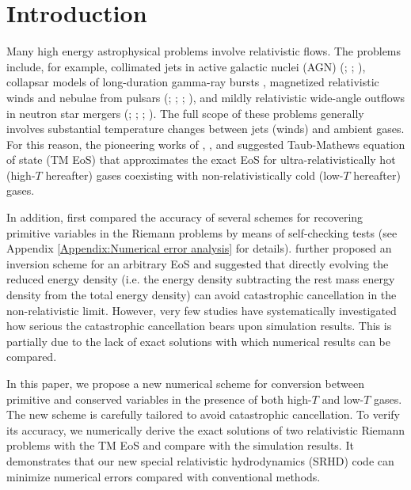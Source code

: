 \documentclass[twocolumn]{aastex63}
\begin{document}
\section{Introduction}
 Many high energy astrophysical problems involve relativistic flows. The problems include, for example, collimated jets in active galactic nuclei (AGN) (\citealt{Chiueh-1991ApJ...377..462C}; \citealt{Chiueh-1992ApJ...394..459L}; \citealt{Blandford2018}), collapsar models of long-duration gamma-ray bursts \citep{LongGRB}, magnetized relativistic winds and nebulae from pulsars (\citealt{1984ApJ...283..694K}; \citealt{1984ApJ...283..710K}; \citealt{Chiue-PhysRevLett.63.113}; \citealt{Chiueh_1998}), and mildly relativistic wide-angle outflows in neutron star mergers (\citealt{NM2}; \citealt{NM1}; \citealt{NM3}; \citealt{NM4}). The full scope of these problems generally involves substantial temperature changes between jets (winds) and ambient gases. For this reason, the pioneering works of \cite{Taub}, \cite{TM_EOS}, and \cite{Compare_TM_EOS} suggested Taub-Mathews equation of state (TM EoS) that approximates the exact EoS \citep{Synge} for ultra-relativistically hot (high-$T$ hereafter) gases coexisting with non-relativistically cold (low-$T$ hereafter) gases.

 In addition, \cite{Noble_2006} first compared the accuracy of several schemes for recovering primitive variables in the Riemann problems by means of self-checking tests (see Appendix \ref{Appendix:Numerical error analysis} for details). \cite{NR_Limit} further proposed an inversion scheme for an arbitrary EoS and suggested that directly evolving the reduced energy density (i.e. the energy density subtracting the rest mass energy density from the total energy density) can avoid catastrophic cancellation in the non-relativistic limit. However, very few studies have systematically investigated how serious the catastrophic cancellation bears upon simulation results. This is partially due to the lack of exact solutions with which numerical results can be compared.

 In this paper, we propose a new numerical scheme for conversion between primitive and conserved variables in the presence of both high-$T$ and low-$T$ gases. The new scheme is carefully tailored to avoid catastrophic cancellation. To verify its accuracy, we numerically derive the exact solutions of two relativistic Riemann problems with the TM EoS and compare with the simulation results. It demonstrates that our new special relativistic hydrodynamics (SRHD) code can minimize numerical errors compared with conventional methods.
\end{document}
